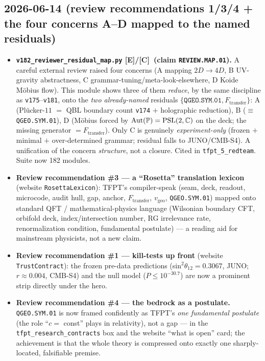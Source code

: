 \documentclass[11pt]{article}
\providecommand{\mE}{\textbf{[E]}}\providecommand{\mC}{\textbf{[C]}}
\providecommand{\vref}[1]{\texttt{#1}}
\begin{document}
\subsection*{2026-06-14 (review recommendations 1/3/4 + the four concerns A--D mapped to the named residuals)}
\begin{itemize}
\item \textbf{\texttt{v182\_reviewer\_residual\_map.py} \mE/\mC\ (claim \texttt{REVIEW.MAP.01}).} A
  careful external review raised four concerns (A mapping $2D\!\to\!4D$, B UV-gravity abstractness,
  C grammar-tuning/meta-look-elsewhere, D Koide M\"obius flow). This module shows three of them
  \emph{reduce}, by the same discipline as \vref{v175}--\vref{v181}, onto the \emph{two already-named}
  residuals $\{\texttt{QGEO.SYM.01},F_{\mathrm{transfer}}\}$: A (Pl\"ucker-$11$ $=$ QBL boundary count
  \vref{v174} $+$ holographic reduction), B ($\equiv$ \texttt{QGEO.SYM.01}), D (M\"obius forced by
  $\mathrm{Aut}(\mathbb{P})=\mathrm{PSL}(2,\mathbb C)$ on the deck; the missing generator $=F_{\mathrm{transfer}}$).
  Only C is genuinely \emph{experiment-only} (frozen $+$ minimal $+$ over-determined grammar; residual
  falls to JUNO/CMB-S4). A unification of the concern \emph{structure}, not a closure. Cited in
  \texttt{tfpt\_5\_redteam}. Suite now 182 modules.
\item \textbf{Review recommendation \#3 --- a ``Rosetta'' translation lexicon} (website
  \texttt{RosettaLexicon}): TFPT's compiler-speak (seam, deck, readout, microcode, audit hull, gap,
  anchor, $F_{\mathrm{transfer}}$, $v_{\mathrm{geo}}$, \texttt{QGEO.SYM.01}) mapped onto standard QFT /
  mathematical-physics language (Wilsonian boundary CFT, orbifold deck, index/intersection number, RG
  irrelevance rate, renormalization condition, fundamental postulate) --- a reading aid for
  mainstream physicists, not a new claim.
\item \textbf{Review recommendation \#1 --- kill-tests up front} (website \texttt{TrustContract}): the
  frozen pre-data predictions (sin$^2\theta_{12}=0.3067$, JUNO; $r\approx0.004$, CMB-S4) and the null
  model ($P\le10^{-30.7}$) are now a prominent strip directly under the hero.
\item \textbf{Review recommendation \#4 --- the bedrock as a postulate.} \texttt{QGEO.SYM.01} is now
  framed confidently as TFPT's \emph{one fundamental postulate} (the role ``$c=$ const'' plays in
  relativity), not a gap --- in the \texttt{tfpt\_research\_contracts} box and the website ``what is
  open'' card; the achievement is that the whole theory is compressed onto exactly one sharply-located,
  falsifiable premise.
\end{itemize}
\end{document}
